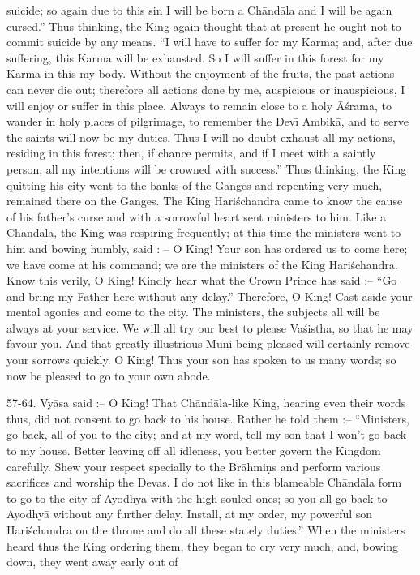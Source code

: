 suicide; so again due to this sin I will be born a Ch\=and\=ala and I will be again cursed.'' Thus thinking, the King again thought that at present he ought not to commit suicide by any means. ``I will have to suffer for my Karma; and, after due suffering, this Karma will be exhausted. So I will suffer in this forest for my Karma in this my body. Without the enjoyment of the fruits, the past actions can never die out; therefore all actions done by me, auspicious or inauspicious, I will enjoy or suffer in this place. Always to remain close to a holy \=A\'srama, to wander in holy places of pilgrimage, to remember the Dev\={\i} Ambik\=a, and to serve the saints will now be my duties. Thus I will no doubt exhaust all my actions, residing in this forest; then, if chance permits, and if I meet with a saintly person, all my intentions will be crowned with success.'' Thus thinking, the King quitting his city went to the banks of the Ganges and repenting very much, remained there on the Ganges. The King Hari\'schandra came to know the cause of his father's curse and with a sorrowful heart sent ministers to him. Like a Ch\=and\=ala, the King was respiring frequently; at this time the ministers went to him and bowing humbly, said : -- O King! Your son has ordered us to come here; we have come at his command; we are the ministers of the King Hari\'schandra. Know this verily, O King! Kindly hear what the Crown Prince has said :-- ``Go and bring my Father here without any delay.'' Therefore, O King! Cast aside your mental agonies and come to the city. The ministers, the subjects all will be always at your service. We will all try our best to please Va\'sistha, so that he may favour you. And that greatly illustrious Muni being pleased will certainly remove your sorrows quickly. O King! Thus your son has spoken to us many words; so now be pleased to go to your own abode.

57-64. Vy\=asa said :-- O King! That Ch\=and\=ala-like King, hearing even their words thus, did not consent to go back to his house. Rather he told them :-- ``Ministers, go back, all of you to the city; and at my word, tell my son that I won't go back to my house. Better leaving off all idleness, you better govern the Kingdom carefully. Shew your respect specially to the Br\=ahmi\d{n}s and perform various sacrifices and worship the Devas. I do not like in this blameable Ch\=and\=ala form to go to the city of Ayodhy\=a with the high-souled ones; so you all go back to Ayodhy\=a without any further delay. Install, at my order, my powerful son Hari\'schandra on the throne and do all these stately duties.'' When the ministers heard thus the King ordering them, they began to cry very much, and, bowing down, they went away early out of

